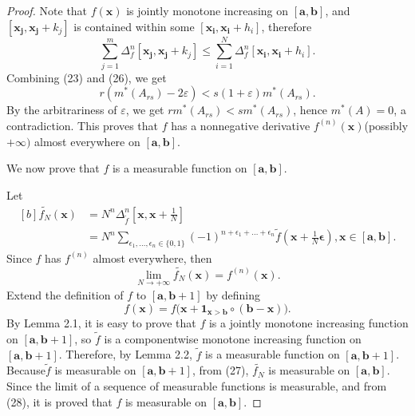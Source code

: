 \documentclass{ijclclp}
\begin{document}
\begin{proof}
    Note that \(f(\boldsymbol{x})\) is jointly monotone increasing on \([\boldsymbol{a},\boldsymbol{b}]\), and \([\boldsymbol{x_j},\boldsymbol{x_j}+k_j]\) is contained within some \([\boldsymbol{x_i},\boldsymbol{x_i}+h_i]\), therefore
    \[\sum_{j=1}^{m}\Delta_f^n[\boldsymbol{x_j},\boldsymbol{x_j}+k_j]\leqslant\sum_{i=1}^{N}\Delta_f^n[\boldsymbol{x_i},\boldsymbol{x_i}+h_i].\]
    Combining (23) and (26), we get 
    \[r(m^{*}(A_{rs})-2\varepsilon)<s(1+\varepsilon)m^{*}(A_{rs}).\]
    By the arbitrariness of \(\varepsilon\), we get \(rm^*(A_{rs})<sm^*(A_{rs})\), hence \(m^*(A)=0\), a contradiction. This proves that \(f\) has a nonnegative derivative \(f^{(n)}(\boldsymbol{x})\)(possibly\(+\infty)\) almost everywhere on \([\boldsymbol{a},\boldsymbol{b}]\).

    We now prove that \(f\) is a measurable function on \([\boldsymbol{a},\boldsymbol{b}]\).

    Let
    \begin{equation}
        \begin{aligned}[b]
            \widetilde{f_N}(\boldsymbol{x})&=N^{n}\Delta_{\widetilde{f}}^n[\boldsymbol{x},\boldsymbol{x}+\frac{1}{N}]\\
            &=N^{n}\sum_{\epsilon_1,\dots,\epsilon_n\in\{0,1\}}(-1)^{n+\epsilon_1+\dots+\epsilon_n}\widetilde{f}(\boldsymbol{x}+\frac{1}{N}\boldsymbol{\epsilon}),
            \boldsymbol{x}\in [\boldsymbol{a},\boldsymbol{b}].
        \end{aligned}
    \end{equation}
    Since \(f\) has \(f^{(n)}\) almost everywhere, then
    \begin{equation}
        \lim_{N\to+\infty}\widetilde{f_N}(\boldsymbol{x})=f^{(n)}(\boldsymbol{x}).
    \end{equation}
    Extend the definition of \(f\) to \([\boldsymbol{a},\boldsymbol{b}+1]\) by defining
    \[f(\boldsymbol{x})=f\big(\boldsymbol{x}+\boldsymbol{1}_{\boldsymbol{x}>\boldsymbol{b}}\circ(\boldsymbol{b}-\boldsymbol{x})\big).\]
    By Lemma 2.1, it is easy to prove that \(f\) is a jointly monotone increasing function on \([\boldsymbol{a},\boldsymbol{b}+1]\), so \(\widetilde{f}\) is a componentwise monotone increasing function on \([\boldsymbol{a},\boldsymbol{b}+1]\). Therefore, by Lemma 2.2, \(\widetilde{f}\) is a measurable function on \([\boldsymbol{a},\boldsymbol{b}+1]\). Because\(\widetilde{f}\) is measurable on \([\boldsymbol{a},\boldsymbol{b}+1]\), from (27), \(\widetilde{f_N}\) is measurable on \([\boldsymbol{a},\boldsymbol{b}]\). Since the limit of a sequence of measurable functions is measurable, and from (28), it is proved that \(f\) is measurable on \([\boldsymbol{a},\boldsymbol{b}]\).


\end{proof}
\end{document}

